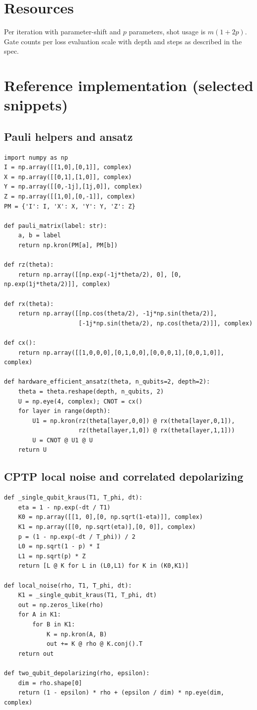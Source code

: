 \documentclass[11pt]{article}
\begin{document}
\section{Resources}
Per iteration with parameter-shift and \(p\) parameters, shot usage is \(m(1+2p)\). Gate counts per loss evaluation scale with depth and steps as described in the spec.

\section{Reference implementation (selected snippets)}
\subsection*{Pauli helpers and ansatz}
\begin{lstlisting}
import numpy as np
I = np.array([[1,0],[0,1]], complex)
X = np.array([[0,1],[1,0]], complex)
Y = np.array([[0,-1j],[1j,0]], complex)
Z = np.array([[1,0],[0,-1]], complex)
PM = {'I': I, 'X': X, 'Y': Y, 'Z': Z}

def pauli_matrix(label: str):
    a, b = label
    return np.kron(PM[a], PM[b])

def rz(theta):
    return np.array([[np.exp(-1j*theta/2), 0], [0, np.exp(1j*theta/2)]], complex)

def rx(theta):
    return np.array([[np.cos(theta/2), -1j*np.sin(theta/2)],
                     [-1j*np.sin(theta/2), np.cos(theta/2)]], complex)

def cx():
    return np.array([[1,0,0,0],[0,1,0,0],[0,0,0,1],[0,0,1,0]], complex)

def hardware_efficient_ansatz(theta, n_qubits=2, depth=2):
    theta = theta.reshape(depth, n_qubits, 2)
    U = np.eye(4, complex); CNOT = cx()
    for layer in range(depth):
        U1 = np.kron(rz(theta[layer,0,0]) @ rx(theta[layer,0,1]),
                     rz(theta[layer,1,0]) @ rx(theta[layer,1,1]))
        U = CNOT @ U1 @ U
    return U
\end{lstlisting}

\subsection*{CPTP local noise and correlated depolarizing}
\begin{lstlisting}
def _single_qubit_kraus(T1, T_phi, dt):
    eta = 1 - np.exp(-dt / T1)
    K0 = np.array([[1, 0],[0, np.sqrt(1-eta)]], complex)
    K1 = np.array([[0, np.sqrt(eta)],[0, 0]], complex)
    p = (1 - np.exp(-dt / T_phi)) / 2
    L0 = np.sqrt(1 - p) * I
    L1 = np.sqrt(p) * Z
    return [L @ K for L in (L0,L1) for K in (K0,K1)]

def local_noise(rho, T1, T_phi, dt):
    K1 = _single_qubit_kraus(T1, T_phi, dt)
    out = np.zeros_like(rho)
    for A in K1:
        for B in K1:
            K = np.kron(A, B)
            out += K @ rho @ K.conj().T
    return out

def two_qubit_depolarizing(rho, epsilon):
    dim = rho.shape[0]
    return (1 - epsilon) * rho + (epsilon / dim) * np.eye(dim, complex)
\end{lstlisting}
\end{document}
